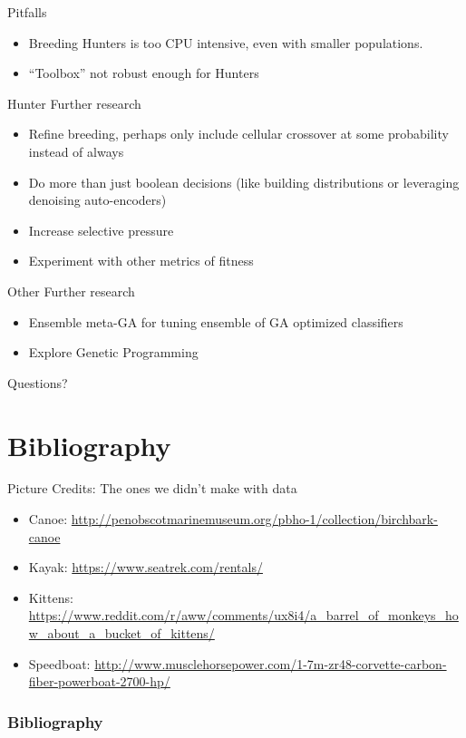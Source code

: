 \documentclass{beamer}
\begin{document}
\begin{frame}{Pitfalls}
\begin{itemize}
	\item Breeding Hunters is too CPU intensive, even with smaller populations.
	\item ``Toolbox'' not robust enough for Hunters
\end{itemize}
\end{frame}
\begin{frame}{Hunter Further research}
	\begin{itemize}
		\item Refine breeding, perhaps only include cellular crossover at some probability instead of always
		\item Do more than just boolean decisions (like building distributions or leveraging denoising auto-encoders)
		\item Increase selective pressure
		\item Experiment with other metrics of fitness
	\end{itemize}
\end{frame}

\begin{frame}{Other Further research}
	\begin{itemize}
		\item Ensemble meta-GA for tuning ensemble of GA optimized classifiers
		\item Explore Genetic Programming
	\end{itemize}
\end{frame}

\begin{frame}{Questions?}
\end{frame}

\section{Bibliography}

\begin{frame}{Picture Credits: The ones we didn't make with data}
	\begin{itemize}
		\item Canoe: \url{http://penobscotmarinemuseum.org/pbho-1/collection/birchbark-canoe}
		\item Kayak: \url{https://www.seatrek.com/rentals/}
		\item Kittens: \url{https://www.reddit.com/r/aww/comments/ux8i4/a_barrel_of_monkeys_how_about_a_bucket_of_kittens/}
		\item Speedboat: \url{http://www.musclehorsepower.com/1-7m-zr48-corvette-carbon-fiber-powerboat-2700-hp/}
	\end{itemize}
\end{frame}

\begin{frame}[allowframebreaks]
	\frametitle{Bibliography}
	
\end{frame}
\end{document}
